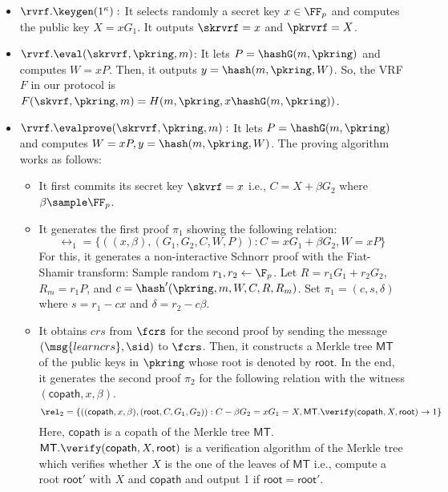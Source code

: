 \begin{itemize}
	\item $ \rvrf.\keygen(1^\kappa):  $ It selects randomly a secret key $ x \in \FF_p$ and computes the public key $ X = xG_1 $. It outputs $ \skrvrf = x $ and $ \pkrvrf = X $.
	\item $ \rvrf.\eval(\skrvrf, \pkring, m) $: It lets $ P = \hashG(m, \pkring) $ and computes $ W = xP  $. Then, it outputs $ y = \hash(m, \pkring, W) $. So, the VRF $ F $ in our protocol is $ F(\skvrf, \pkring, m) = H(m, \pkring, x\hashG(m,\pkring)) $.
	\item $ \rvrf.\evalprove(\skrvrf, \pkring, m) :$ It lets $ P = \hashG(m, \pkring) $ and computes $ W= xP, y = \hash(m, \pkring, W) $. The proving algorithm works as follows:
	\begin{itemize}
		\item It first commits its secret key $ \skvrf = x$ i.e., $ C = X + \beta G_2 $ where $ \beta \sample \FF_p $.
		\item It generates the first proof $ \pi_1 $ showing the following relation:
		$$\rel_1 = \{((x, \beta), (G_1, G_2, C,W,P)): C = xG_1 + \beta G_2, W = xP \}$$
		For this, it generates a non-interactive Schnorr proof with the Fiat-Shamir transform:  Sample random $r_1, r_2 \leftarrow \F_p$.
		Let $R = r_1 G_1 + r_2 G_2$, $R_m = r_1 P$, and
		$c = \hash'(\pkring, m, W,C,R,R_m)$.
		Set $\pi_1 = (c,s,\delta)$ where $s = r_1 - c x$ and $\delta = r_2 - c \beta$.
		\item It obtains $ crs $ from $ \fcrs $ for the second proof by sending the message $ (\msg{learncrs}, \sid) $ to $ \fcrs $. Then, it constructs a Merkle tree $ \mathsf{MT} $ of the public keys in $ \pkring $ whose root is denoted by $ \mathsf{root} $. In the end, it generates the second proof $ \pi_2 $ for the following relation with  the witness $ (\mathsf{copath}, x, \beta) $. 
		$$ \rel_2 = \{((\mathsf{copath}, x, \beta),(\mathsf{root}, C, G_1, G_2)): C-\beta G_2 = xG_1 = X, \mathsf{MT}.\verify(\mathsf{copath}, X, \mathsf{root} ) \rightarrow 1\} $$
		Here, $ \mathsf{copath} $ is a copath of the Merkle tree $ \mathsf{MT} $. $ \mathsf{MT}.\verify(\mathsf{copath}, X, \mathsf{root} ) $ is a verification algorithm of the Merkle tree which verifies whether $ X $ is the one of the leaves of $ \mathsf{MT} $ i.e., compute a root $ \mathsf{root}' $ with $ X $ and $ \mathsf{copath} $ and output 1 if $ \mathsf{root} = \mathsf{root}' $.
		

\end{itemize}
\end{itemize}
